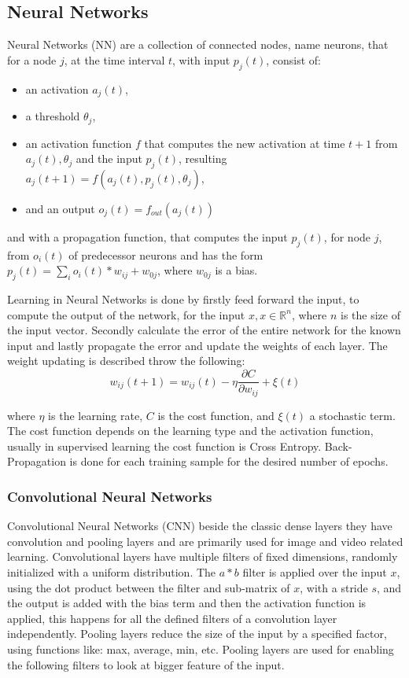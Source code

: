 \documentclass[12pt]{article}
\theoremstyle{definition}
\begin{document}
	\subsection{Neural Networks}

	Neural Networks (NN) are a collection of connected nodes, name neurons, that for a node $j$, at the time interval $t$, with input  $p_j(t)$, consist of:
	\begin{itemize}
		\item an activation $a_j(t)$,
		\item a threshold $\theta_j$,
		\item an activation function $f$ that computes the new activation at time $t+1$ from $a_j(t), \theta_j$ and the input $p_j(t)$, resulting $a_j(t+1)=f(a_j(t), p_j(t), \theta_j)$,
		\item and an output $o_j(t)=f_{out}(a_j(t))$
	\end{itemize}
	and with a propagation function, that computes the input $p_j(t)$, for node $j$, from $o_i(t)$ of predecessor neurons and has the form $p_j(t)=\sum_io_i(t)*w_{ij} + w_{0j}$, where $w_{0j}$ is a bias.

	Learning in Neural Networks is done by firstly feed forward the input, to compute the output of the network, for the input $x, x \in \mathbb{R}^n$, where $n$ is the size of the input vector. Secondly calculate the error of the entire network for the known input and lastly propagate the error and update the weights of each layer. The weight updating is described throw the following:
	\begin{equation*}
		w_{ij}(t+1)=w_{ij}(t)-\eta\frac{\partial C}{\partial w_{ij}}+ \xi(t)
	\end{equation*}

	where $\eta$ is the learning rate, $C$ is the cost function, and $\xi(t)$ a stochastic term. The cost function depends on the learning type and the activation function, usually in supervised learning the cost function is Cross Entropy. Back-Propagation is done for each training sample for the desired number of epochs.


	\subsubsection{Convolutional Neural Networks}

	Convolutional Neural Networks (CNN) beside the classic dense layers they have convolution and pooling layers and are primarily used for image and video related learning.
	Convolutional layers have multiple filters of fixed dimensions, randomly initialized with a uniform distribution. The $a*b$ filter is applied over the input $x$, using the dot product between the filter and sub-matrix of $x$,  with a stride $s$, and the output is added with the bias term and then the activation function is applied, this happens for all the defined filters of a convolution layer independently. Pooling layers reduce the size of the input by a specified factor, using functions like: max, average, min, etc. Pooling layers are used for enabling the following filters to look at bigger feature of the input.
\end{document}
